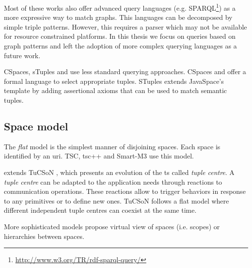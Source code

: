 Most of these works also offer advanced query languages (e.g. SPARQL\footnote{\url{http://www.w3.org/TR/rdf-sparql-query/}}) as a more expressive way to match graphs.
This languages can be decomposed by simple triple patterns.
However, this requires a parser which may not be available for resource constrained platforms.
In this thesis we focus on queries based on graph patterns and left the adoption of more complex querying languages as a future work.

CSpaces, sTuples and \citeauthor{nardini_semantic_2013} use less standard querying approaches.
CSpaces \citep{martinrecuerda_towards_2005} and \citet{nardini_semantic_2013} offer a formal language to select appropriate tuples.
STuples\citep{khushraj_stuples:_2004} extends JavaSpace's template by adding assertional axioms that can be used to match semantic tuples.


\subsection{Space model}

The \emph{flat} model is the simplest manner of disjoining spaces.
Each space is identified by an \ac{uri}.
TSC, tsc++ and Smart-M3 use this model.


\citet{nardini_semantic_2013} extends TuCSoN \cite{omicini_tucson:_1998}, which presents an evolution of the \ac{ts} called \emph{tuple centre}.
A \emph{tuple centre} can be adapted to the application needs through reactions to communication operations.
These reactions allow to trigger behaviors in response to any primitives or to define new ones.
TuCSoN follows a flat model where different independent tuple centres can coexist at the same time. %


More sophisticated models propose virtual view of spaces (i.e. scopes) or hierarchies between spaces.

